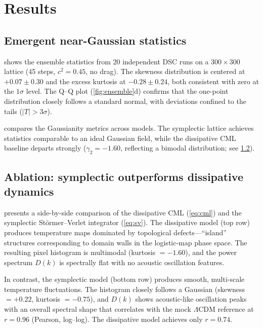 \section{Results}
\label{sec:results}

\subsection{Emergent near-Gaussian statistics}
\label{sec:gauss}

 shows the ensemble statistics from 20 independent DSC runs on a $300 \times 300$ lattice (45 steps, $c^2 = 0.45$, no drag).
The skewness distribution is centered at $+0.07 \pm 0.30$ and the excess kurtosis at $-0.28 \pm 0.24$, both consistent with zero at the $1\sigma$ level.
The Q--Q plot (\cref{fig:ensemble}d) confirms that the one-point distribution closely follows a standard normal, with deviations confined to the tails ($|T| > 3\sigma$).

 compares the Gaussianity metrics across models.
The symplectic lattice achieves statistics comparable to an ideal Gaussian field, while the dissipative CML baseline departs strongly ($\gamma_2 = -1.60$, reflecting a bimodal distribution; see \cref{sec:ablation}).



\subsection{Ablation: symplectic outperforms dissipative dynamics}
\label{sec:ablation}

 presents a side-by-side comparison of the dissipative CML (\cref{eq:cml}) and the symplectic St\"ormer--Verlet integrator (\cref{eq:sv}).
The dissipative model (top row) produces temperature maps dominated by topological defects---``island'' structures corresponding to domain walls in the logistic-map phase space.
The resulting pixel histogram is multimodal (kurtosis $= -1.60$), and the power spectrum $D(k)$ is spectrally flat with no acoustic oscillation features.

In contrast, the symplectic model (bottom row) produces smooth, multi-scale temperature fluctuations.
The histogram closely follows a Gaussian (skewness $= +0.22$, kurtosis $= -0.75$), and $D(k)$ shows acoustic-like oscillation peaks with an overall spectral shape that correlates with the mock $\Lambda$CDM reference at $r = 0.96$ (Pearson, log--log).
The dissipative model achieves only $r = 0.74$.

